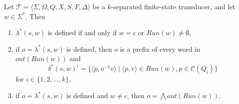 \begin{lemma}\label{lem:quasisubseq_invariant}
  Let $\mathcal{T} = \langle \Sigma, \Omega, Q, X, S, F, \Delta \rangle$ be a
  $k$-separated finite-state transducer, and let $w \in \Sigma^*$. Then
  \begin{enumerate}
    \item $\lambda^*(s, w)$ is defined if and only if $w = \epsilon$ or $Run(w) \neq
      \emptyset$,
    \item if $o = \lambda^*(s, w)$ is defined, then $o$ is a prefix of every word in
      $out(Run(w))$ and
      \begin{equation*}
        \delta^*(s, w)^i = \{ \langle p, o^{-1}v \rangle \mid \langle p, v \rangle \in
        Run(w), p \in \mathcal{C}(Q_i) \}
      \end{equation*}
      for $i \in \{ 1, 2, \ldots, k \}$,
    \item if $o = \lambda^*(s, w)$ is defined and $w \neq \epsilon$, then $o =
      \bigwedge out(Run(w))$.
  \end{enumerate}
\end{lemma}

